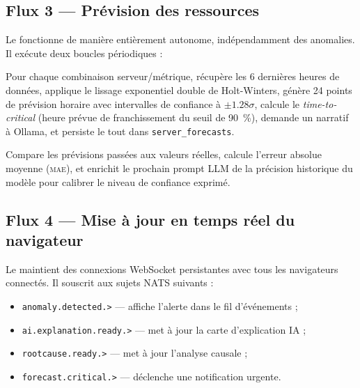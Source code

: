 \subsection{Flux 3 — Prévision des ressources}

Le  fonctionne de manière entièrement autonome,
indépendamment des anomalies. Il exécute deux boucles périodiques :

\begin{description}[leftmargin=2cm]
  \item[Boucle de prévision (toutes les 30~min)] Pour chaque combinaison
    serveur/métrique, récupère les 6 dernières heures de données, applique
    le lissage exponentiel double de Holt-Winters, génère 24 points de
    prévision horaire avec intervalles de confiance à $\pm 1.28\sigma$,
    calcule le \textit{time-to-critical} (heure prévue de franchissement du
    seuil de 90~\%), demande un narratif à Ollama, et persiste le tout dans
    \texttt{server\_forecasts}.
  \item[Boucle d'évaluation (toutes les 60~min)] Compare les prévisions
    passées aux valeurs réelles, calcule l'erreur absolue moyenne (\textsc{mae}),
    et enrichit le prochain prompt LLM de la précision historique du modèle
    pour calibrer le niveau de confiance exprimé.
\end{description}

\subsection{Flux 4 — Mise à jour en temps réel du navigateur}

Le  maintient des connexions WebSocket persistantes
avec tous les navigateurs connectés. Il souscrit aux sujets NATS suivants :

\begin{itemize}
  \item \texttt{anomaly.detected.>} — affiche l'alerte dans le fil d'événements ;
  \item \texttt{ai.explanation.ready.>} — met à jour la carte d'explication IA ;
  \item \texttt{rootcause.ready.>} — met à jour l'analyse causale ;
  \item \texttt{forecast.critical.>} — déclenche une notification urgente.
\end{itemize}

